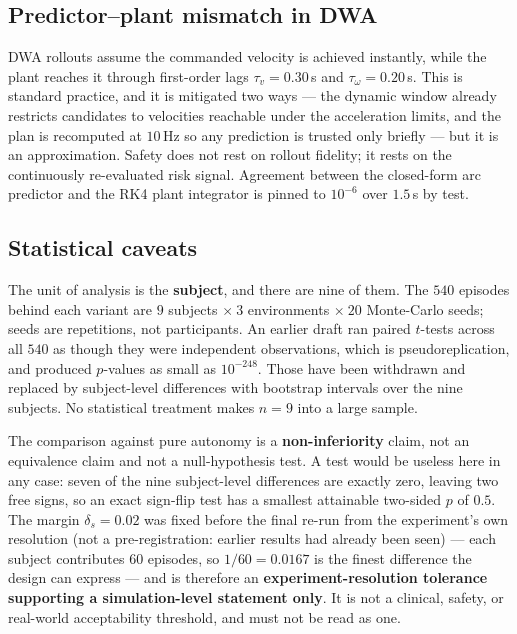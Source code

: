 \documentclass[11pt,a4paper]{article}
\theoremstyle{plain}
\theoremstyle{definition}
\begin{document}
\subsection{Predictor--plant mismatch in DWA}

DWA rollouts assume the commanded velocity is achieved instantly, while
the plant reaches it through first-order lags $\tau_v = 0.30$\,s and
$\tau_\omega = 0.20$\,s. This is standard practice, and it is mitigated
two ways --- the dynamic window already restricts candidates to
velocities reachable under the acceleration limits, and the plan is
recomputed at $10$\,Hz so any prediction is trusted only briefly ---
but it is an approximation. Safety does not rest on rollout fidelity; it
rests on the continuously re-evaluated risk signal. Agreement between
the closed-form arc predictor and the RK4 plant integrator is pinned to
$10^{-6}$ over $1.5$\,s by test.

\subsection{Statistical caveats}
\label{sec:stats}

The unit of analysis is the \textbf{subject}, and there are nine of
them. The $540$ episodes behind each variant are $9$ subjects $\times\ 3$
environments $\times\ 20$ Monte-Carlo seeds; seeds are repetitions, not
participants. An earlier draft ran paired $t$-tests across all $540$ as
though they were independent observations, which is pseudoreplication,
and produced $p$-values as small as $10^{-248}$. Those have been
withdrawn and replaced by subject-level differences with bootstrap
intervals over the nine subjects. No statistical treatment makes $n = 9$
into a large sample.

The comparison against pure autonomy is a \textbf{non-inferiority}
claim, not an equivalence claim and not a null-hypothesis test. A test
would be useless here in any case: seven of the nine subject-level
differences are exactly zero, leaving two free signs, so an exact
sign-flip test has a smallest attainable two-sided $p$ of $0.5$. The
margin $\delta_s = 0.02$ was fixed before the final re-run from the
experiment's own resolution (not a pre-registration: earlier results had
already been seen) --- each subject contributes $60$ episodes, so $1/60 = 0.0167$
is the finest difference the design can express --- and is therefore an
\textbf{experiment-resolution tolerance supporting a simulation-level
statement only}. It is not a clinical, safety, or real-world
acceptability threshold, and must not be read as one.
\end{document}
